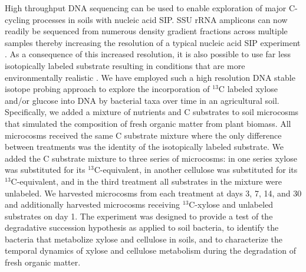 High throughput DNA sequencing can be used to enable exploration of major
C-cycling processes in soils with nucleic acid SIP. SSU rRNA amplicons can now
readily be sequenced from numerous density gradient fractions across multiple
samples thereby increasing the resolution of a typical nucleic acid SIP
experiment \citep{Verastegui_2014}. As a consequence of this increased
resolution, it is also possible to use far less isotopically labeled
substrate resulting in conditions that are more environmentally realistic
\citep{Aoyagi2015}. We have employed such a high resolution DNA
stable isotope probing approach to explore the incorporation of $^{13}$C
labeled xylose and/or glucose into DNA by bacterial taxa over time in an
agricultural soil. Specifically, we added a mixture of nutrients and
C substrates to soil microcosms that simulated the composition of fresh organic
matter from plant biomass. All microcosms received the same C substrate mixture
where the only difference between treatments was the identity of the
isotopically labeled substrate. We added the C substrate mixture to three
series of microcosms: in one series xylose was substituted for its
$^{13}$C-equivalent, in another cellulose was substituted for its
$^{13}$C-equivalent, and in the third treatment all substrates in the mixture
were unlabeled. We harvested microcosms from each treatment at days 3, 7, 14,
and 30 and additionally harvested microcosms receiving $^{13}$C-xylose and
unlabeled substrates on day 1. The experiment was designed to provide a test of
the degradative succession hypothesis as applied to soil bacteria, to identify
the bacteria that metabolize xylose and cellulose in soils, and to characterize
the temporal dynamics of xylose and cellulose metabolism during the degradation
of fresh organic matter. 
